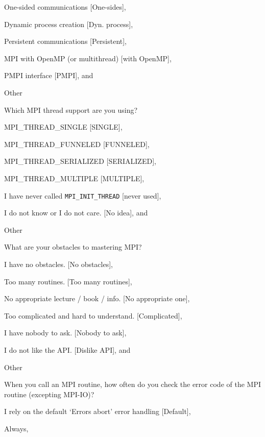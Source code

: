 \documentclass[preprint,5p,times]{elsarticle}
\begin{document}
{{\begin{description}
\begin{inparaenum}[{\bf C}1)]
    \item One-sided communications [One-sides],
    \item Dynamic process creation [Dyn. process],
    \item Persistent communications [Persistent],
    \item MPI with OpenMP (or multithread) [with OpenMP],
    \item PMPI interface [PMPI], and
    \item Other
    \end{inparaenum}
  \item[Q18*:] Which MPI thread support are you using?
    \begin{inparaenum}[{\bf C}1)]
    \item MPI\_THREAD\_SINGLE [SINGLE],
    \item MPI\_THREAD\_FUNNELED [FUNNELED],
    \item MPI\_THREAD\_SERIALIZED [SERIALIZED],
    \item MPI\_THREAD\_MULTIPLE [MULTIPLE],
    \item I have never called {\tt MPI\_INIT\_THREAD} [never used],
    \item I do not know or I do not care. [No idea], and
    \item Other
    \end{inparaenum}
  \item[Q19*:] What are your obstacles to mastering MPI?
    \begin{inparaenum}[{\bf C}1)]
    \item I have no obstacles. [No obstacles],
    \item Too many routines. [Too many routines],
    \item No appropriate lecture / book / info. [No appropriate one],
    \item Too complicated and hard to understand. [Complicated],
    \item I have nobody to ask. [Nobody to ask],
    \item I do not like the API. [Dislike API], and
    \item Other
    \end{inparaenum}
  \item[Q20:] When you call an MPI routine, how often do you check the error code of the MPI routine  (excepting MPI-IO)?
    \begin{inparaenum}[{\bf C}1)]
    \item I rely on the default ‘Errors abort’ error handling [Default],
    \item Always,

\end{inparaenum}
\end{description}}}
\end{document}

